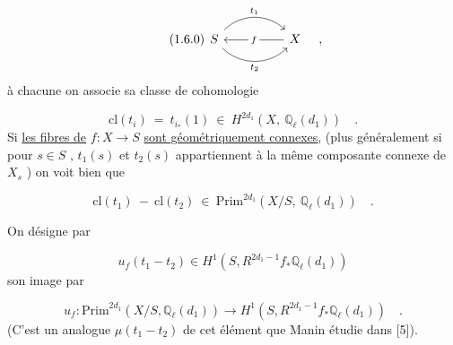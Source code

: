 \begin{equation}\tag{1.6.0}
\begin{tikzcd}[column sep=huge]
S \arrow[r, bend left=45, "t_1"] \arrow[r, bend right=45, "t_2"'] & X \arrow[l, "f" description]
\end{tikzcd} \quad ,
\end{equation}
à chacune on associe sa classe de cohomologie

\begin{equation}\tag{1.6.1}
\mathrm{cl}(t_i) \ = \ t_{i_*}(1) \ \in \ H^{2d_1} (X, \ \mathbb{Q}_\ell(d_1)) \quad .
\end{equation}
Si \underline{les fibres de} $f : X \longrightarrow S$ \underline{sont géométriquement connexes}, (plus généralement si pour $s \in S$ , $t_1(s)$ et $t_2(s)$ appartiennent à la même composante connexe de $X_s$ ) on voit bien que

\begin{equation}\tag{1.6.2}
\mathrm{cl}(t_1) \ - \ \mathrm{cl}(t_2) \ \in \ \mathrm{Prim}^{2d_1} (X/S, \ \mathbb{Q}_\ell(d_1)) \quad .
\end{equation}


On désigne par

\begin{equation}\tag{1.6.3}
u_f(t_1-t_2) \in H^1(S, R^{2d_1-1}f_*\mathbb{Q}_\ell(d_1))
\end{equation}
son image par

\begin{equation}\tag{1.6.4}
u_f : \mathrm{Prim}^{2d_1}(X/S, \mathbb{Q}_\ell(d_1)) \longrightarrow H^1(S, R^{2d_1-1}f_*\mathbb{Q}_\ell(d_1)) \quad .
\end{equation}
(C'est un analogue $\mu(t_1 - t_2)$ de cet élément que Manin étudie dans [5]).

